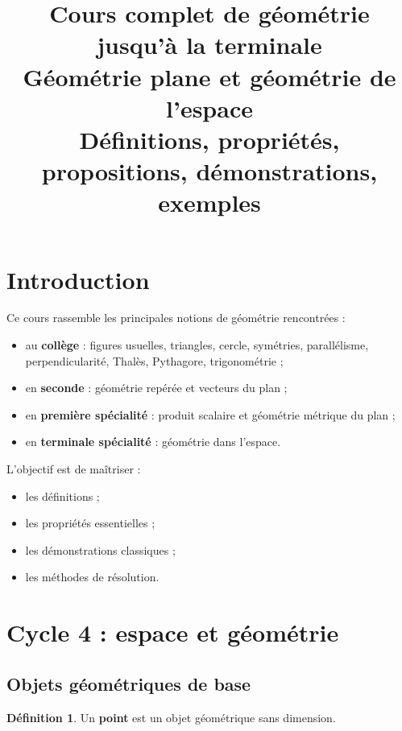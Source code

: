 \documentclass[11pt,a4paper]{article}
\title{\textbf{Cours complet de géométrie jusqu'à la terminale}\\
\large Géométrie plane et géométrie de l'espace\\
\large Définitions, propriétés, propositions, démonstrations, exemples}
\author{}
\date{}
\theoremstyle{definition}
\newtheorem{definition}{Définition}[section]
\theoremstyle{plain}
\begin{document}
\maketitle
\tableofcontents
\newpage

\section*{Introduction}

Ce cours rassemble les principales notions de géométrie rencontrées :
\begin{itemize}
    \item au \textbf{collège} : figures usuelles, triangles, cercle, symétries, parallélisme, perpendicularité, Thalès, Pythagore, trigonométrie ;
    \item en \textbf{seconde} : géométrie repérée et vecteurs du plan ;
    \item en \textbf{première spécialité} : produit scalaire et géométrie métrique du plan ;
    \item en \textbf{terminale spécialité} : géométrie dans l'espace.
\end{itemize}

L'objectif est de maîtriser :
\begin{itemize}
    \item les définitions ;
    \item les propriétés essentielles ;
    \item les démonstrations classiques ;
    \item les méthodes de résolution.
\end{itemize}

\newpage

\section{Cycle 4 : espace et géométrie}

\subsection{Objets géométriques de base}

\begin{definition}
Un \textbf{point} est un objet géométrique sans dimension.
\end{definition}
\end{document}
